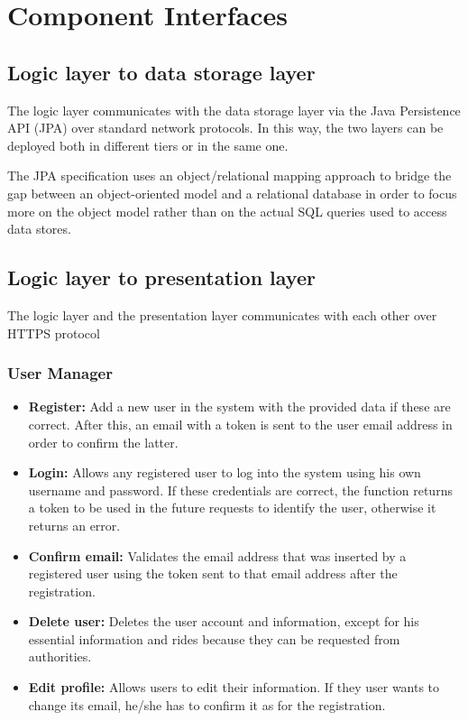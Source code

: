 \section{Component Interfaces}

\subsection{Logic layer to data storage layer}
The logic layer communicates with the data storage layer via the Java Persistence API (JPA) over standard network protocols.
In this way, the two layers can be deployed both in different tiers or in the same one.

The JPA specification uses an object/relational mapping approach to bridge the gap between an object-oriented model and a relational database in order to focus more on the object model rather than on the actual SQL queries used to access data stores.

\subsection{Logic layer to presentation layer}

The logic layer and the presentation layer communicates with each other over HTTPS protocol %

\subsubsection{User Manager}
\begin{itemize}
	\item \textbf{Register:} Add a new user in the system with the provided data if these are correct.
	After this, an email with a token is sent to the user email address in order to confirm the latter.
    \item \textbf{Login:} Allows any registered user to log into the system using his own username and password.
    If these credentials are correct, the function returns a token to be used in the future requests to identify the user, otherwise it returns an error.
    \item \textbf{Confirm email:} Validates the email address that was inserted by a registered user using the token sent to that email address after the registration.
    \item \textbf{Delete user:} Deletes the user account and information, except for his essential information and rides because they can be requested from authorities.
	\item \textbf{Edit profile:} Allows users to edit their information. If they user wants to change its email, he/she has to confirm it as for the registration.
\end{itemize}

